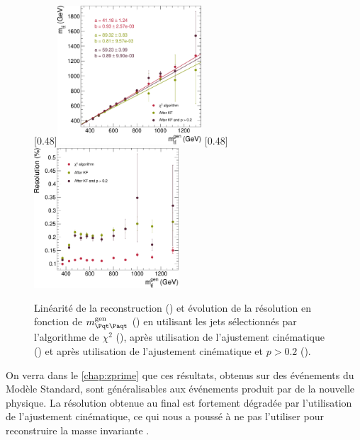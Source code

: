 \begin{figure}[tbp] \centering
    \subcaptionbox{\label{fig:mtt_response_kf_all}}[0.48\textwidth]{\includegraphics[width=0.48\textwidth]{chapitre6/figs/kinfit/mtt_response_vs_gen_comparison_kf_all_events.pdf}} \hfill
    \subcaptionbox{\label{fig:mtt_reso_vs_mtt_gen_kf_all}}[0.48\textwidth]{\includegraphics[width=0.48\textwidth]{chapitre6/figs/kinfit/mtt_resolution_vs_gen_comparison_kf_all_events.pdf}}
    \caption{Linéarité de la reconstruction () et évolution de la résolution en fonction de $\mtt^\text{gen}$ () en utilisant les jets sélectionnés par l'algorithme de $\chi^2$ (\rouge), après utilisation de l'ajustement cinématique (\vertc) et après utilisation de l'ajustement cinématique et $p > \num{0.2}$ (\violet).}
    \label{fig:mtt_resp_reso_kf_all_events}
\end{figure}

\bigskip

On verra dans le \cref{chap:zprime} que ces résultats, obtenus sur des événements \ttbar du Modèle Standard, sont généralisables aux événements \ttbar produit par de la nouvelle physique. La résolution obtenue au final est fortement dégradée par l'utilisation de l'ajustement cinématique, ce qui nous a poussé à ne pas l'utiliser pour reconstruire la masse invariante \ttbar.

